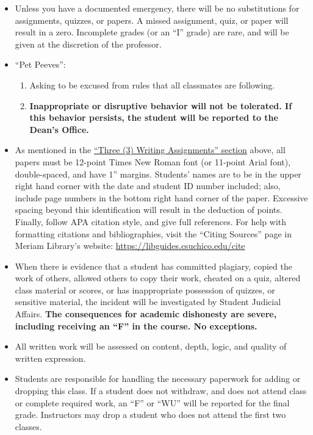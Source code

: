 \documentclass[11pt,]{article}
\providecommand{\tightlist}{%
  \setlength{\itemsep}{0pt}\setlength{\parskip}{0pt}}
\begin{document}
\begin{itemize}
\item
  Unless you have a documented emergency, there will be no substitutions
  for assignments, quizzes, or papers. A missed assignment, quiz, or
  paper will result in a zero. Incomplete grades (or an ``I'' grade) are
  rare, and will be given at the discretion of the professor.
\item
  ``Pet Peeves'':

  \begin{enumerate}
  \def\labelenumi{\arabic{enumi}.}
  \tightlist
  \item
    Asking to be excused from rules that all classmates are following.
  \item
    \textbf{Inappropriate or disruptive behavior will not be tolerated.
    If this behavior persists, the student will be reported to the
    Dean's Office.}
  \end{enumerate}
\item
  As mentioned in the \protect\hyperlink{writing_assignments}{``Three
  (3) Writing Assignments'' section} above, all papers must be 12-point
  Times New Roman font (or 11-point Arial font), double-spaced, and have
  1'' margins. Students' names are to be in the upper right hand corner
  with the date and student ID number included; also, include page
  numbers in the bottom right hand corner of the paper. Excessive
  spacing beyond this identification will result in the deduction of
  points. Finally, follow APA citation style, and give full references.
  For help with formatting citations and bibliographies, visit the
  ``Citing Sources'' page in Meriam Library's website:
  \url{https://libguides.csuchico.edu/cite}
\item
  When there is evidence that a student has committed plagiary, copied
  the work of others, allowed others to copy their work, cheated on a
  quiz, altered class material or scores, or has inappropriate
  possession of quizzes, or sensitive material, the incident will be
  investigated by Student Judicial Affairs. \textbf{The consequences for
  academic dishonesty are severe, including receiving an ``F'' in the
  course. No exceptions.}
\item
  All written work will be assessed on content, depth, logic, and
  quality of written expression.
\item
  Students are responsible for handling the necessary paperwork for
  adding or dropping this class. If a student does not withdraw, and
  does not attend class or complete required work, an ``F'' or ``WU''
  will be reported for the final grade. Instructors may drop a student
  who does not attend the first two classes.
\end{itemize}
\end{document}
